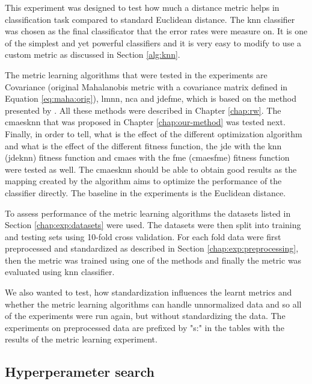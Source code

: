 \documentclass[12pt,a4paper]{report}
\begin{document}
This experiment was designed to test how much a distance metric helps in classification task compared to standard Euclidean distance. The \ac{knn} classifier was chosen as the final classificator that the error rates were measure on. It is one of the simplest and yet powerful classifiers and it is very easy to modify to use a custom metric as discussed in Section \ref{alg:knn}.

The metric learning algorithms that were tested in the experiments are Covariance (original Mahalanobis metric with a covariance matrix defined in Equation \ref{eq:maha:orig}), \ac{lmnn}, \ac{nca} and \ac{jdefme}, which is based on the method presented by \citep{fukui2013evolutionary}. All these methods were described in Chapter \ref{chap:rw}. The \ac{cmaesknn} that was proposed in Chapter \ref{chap:our-method} was tested next. Finally, in order to tell, what is the effect of the different optimization algorithm and what is the effect of the different fitness function, the \ac{jde} with the \ac{knn} (\ac{jdeknn}) fitness function and \ac{cmaes} with the \acl{fme} (\ac{cmaesfme}) fitness function were tested as well. The \ac{cmaesknn} should be able to obtain good results as the mapping created by the algorithm aims to optimize the performance of the classifier directly. The baseline in the experiments is the Euclidean distance.

To assess performance of the metric learning algorithms the datasets listed in Section \ref{chap:exp:datasets} were used. The datasets were then split into training and testing sets using 10-fold cross validation. For each fold data were first preprocessed and standardized as described in Section \ref{chap:exp:preprocessing}, then the metric was trained using one of the methods and finally the metric was evaluated using \ac{knn} classifier.

We also wanted to test, how standardization influences the learnt metrics and whether the metric learning algorithms can handle unnormalized data and so all of the experiments were run again, but without standardizing the data. The experiments on preprocessed data are prefixed by "s:" in the tables with the results of the metric learning experiment.

\subsection{Hyperperameter search} \label{chap:exp:hypsearch}
\end{document}
